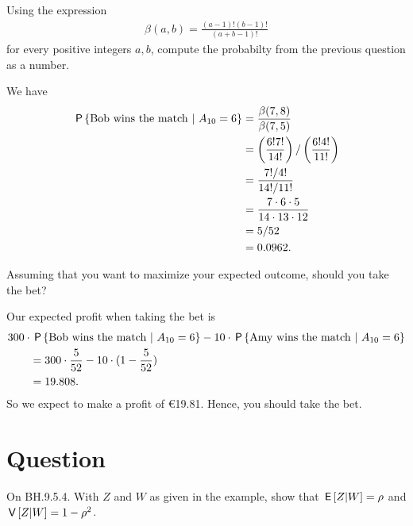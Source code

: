 \begin{exercise}
Using the expression
\begin{align}
    \beta(a,b) = \frac{(a-1)!(b-1)!}{(a+b-1)!}
\end{align}
for every positive integers $a,b$, compute the probabilty from the previous question as a number.
\begin{solution}
We have
\begin{align}
    \P{ \text{Bob wins the match} \ | \ A_{10} = 6 } &= \frac{\beta(7,8)}{\beta(7,5)} \\
    &= \left(\frac{6!7!}{14!}\right)/\left(\frac{6!4!}{11!}\right) \\
    &= \frac{7!/4!}{14!/11!} \\
    &= \frac{7\cdot 6 \cdot 5}{14 \cdot 13 \cdot 12} \\
    &= 5/52 \\
    &= 0.0962.
\end{align}
\end{solution}
\end{exercise}

\begin{exercise}
Assuming that you want to maximize your expected outcome, should you take the bet?
\begin{solution}
Our expected profit when taking the bet is
\begin{align}
    &300 \cdot \P{ \text{Bob wins the match} \ | \ A_{10} = 6 } - 10 \cdot \P{ \text{Amy wins the match} \ | \ A_{10} = 6 } \\
    &\qquad= 300 \cdot \frac{5}{52} - 10 \cdot (1 - \frac{5}{52}) \\
    &\qquad= 19.808.
\end{align}
So we expect to make a profit of €19.81. Hence, you should take the bet.
\end{solution}
\end{exercise}


\section{Question}

\begin{exercise}
On BH.9.5.4. With $Z$ and $W$ as given in the example, show that $\E{Z|W} = \rho$ and $\V{Z|W} = 1-\rho^{2}$.
\begin{hint}
\end{hint}
\begin{solution}
\end{solution}
\end{exercise}

